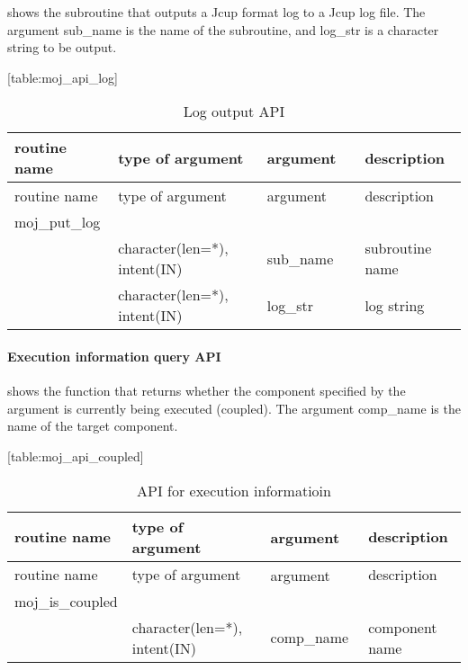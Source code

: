 shows the subroutine that outputs a Jcup format log to a Jcup log file.
The argument sub\_name is the name of the subroutine, and log\_str is a
character string to be output.

\protect\hypertarget{table:moj_api_log}{}{{[}table:moj\_api\_log{]}}

\hypertarget{table:moj_api_log}{}
\begin{longtable}[]{@{}llll@{}}
\caption{Log output API}\tabularnewline
\toprule
routine name & type of argument & argument　 &
description\tabularnewline
\midrule
\endfirsthead
\toprule
routine name & type of argument & argument　 &
description\tabularnewline
\midrule
\endhead
moj\_put\_log & & &\tabularnewline
& character(len=*), intent(IN) & sub\_name & subroutine
name\tabularnewline
& character(len=*), intent(IN) & log\_str & log string\tabularnewline
\bottomrule
\end{longtable}

\hypertarget{execution-information-query-api}{%
\paragraph{Execution information query
API}\label{execution-information-query-api}}

shows the function that returns whether the component specified by the
argument is currently being executed (coupled). The argument comp\_name
is the name of the target component.

\protect\hypertarget{table:moj_api_coupled}{}{{[}table:moj\_api\_coupled{]}}

\hypertarget{table:moj_api_coupled}{}
\begin{longtable}[]{@{}llll@{}}
\caption{API for execution informatioin}\tabularnewline
\toprule
routine name & type of argument & argument　 &
description\tabularnewline
\midrule
\endfirsthead
\toprule
routine name & type of argument & argument　 &
description\tabularnewline
\midrule
\endhead
moj\_is\_coupled & & &\tabularnewline
& character(len=*), intent(IN) & comp\_name & component
name\tabularnewline
\bottomrule
\end{longtable}
